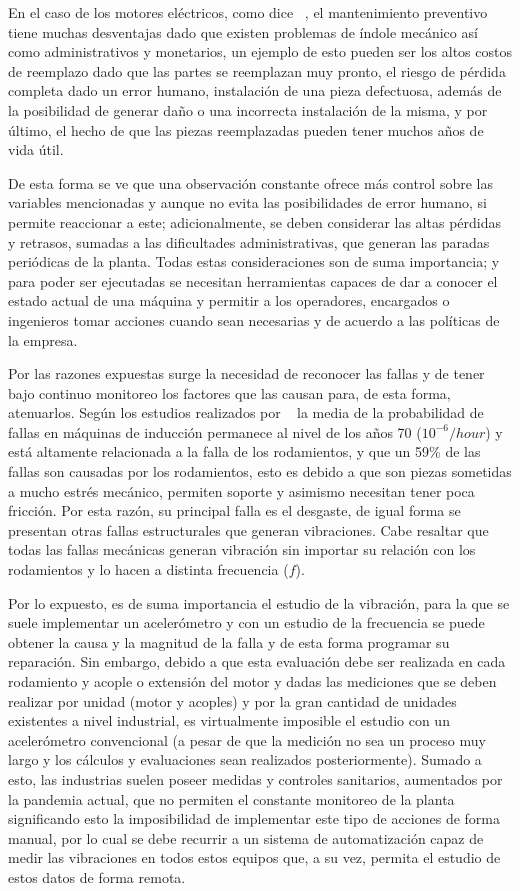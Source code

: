 En el caso de los motores eléctricos, como dice ~\textcite{Lacey}, el
mantenimiento preventivo tiene muchas desventajas dado que existen problemas de
índole mecánico así como administrativos y monetarios, un ejemplo de esto
pueden ser los altos costos de reemplazo dado que las partes se reemplazan muy
pronto, el riesgo de pérdida completa dado un error humano, instalación de una
pieza defectuosa, además de la posibilidad de generar daño o una incorrecta
instalación de la misma, y por último, el hecho de que las piezas reemplazadas
pueden tener muchos años de vida útil.

De esta forma se ve que una observación constante ofrece más control sobre las
variables mencionadas y aunque no evita las posibilidades de error humano, si
permite reaccionar a este; adicionalmente, se deben considerar las altas
pérdidas y retrasos, sumadas a las dificultades administrativas, que generan
las paradas periódicas de la planta. Todas estas consideraciones son de suma
importancia; y para poder ser ejecutadas se necesitan herramientas capaces de
dar a conocer el estado actual de una máquina y permitir a los operadores,
encargados o ingenieros tomar acciones cuando sean necesarias y de acuerdo a
las políticas de la empresa.

Por las razones expuestas surge la necesidad de reconocer las fallas y de tener
bajo continuo monitoreo los factores que las causan para, de esta forma,
atenuarlos. Según los estudios realizados por ~\textcite{Kammermann} la media
de la probabilidad de fallas en máquinas de inducción permanece al nivel de los
años 70 ($10^{-6}/hour$) y está altamente relacionada a la falla de los
rodamientos, y que un 59\% de las fallas son causadas por los rodamientos, esto
es debido a que son piezas sometidas a mucho estrés mecánico, permiten soporte
y asimismo necesitan tener poca fricción. Por esta razón, su principal falla es
el desgaste, de igual forma se presentan otras fallas estructurales que generan
vibraciones. Cabe resaltar que todas las fallas mecánicas generan vibración sin
importar su relación con los rodamientos y lo hacen a distinta frecuencia
($f$).

Por lo expuesto, es de suma importancia el estudio de la vibración, para la que
se suele implementar un acelerómetro y con un estudio de la frecuencia se puede
obtener la causa y la magnitud de la falla y de esta forma programar su
reparación. Sin embargo, debido a que esta evaluación debe ser realizada en
cada rodamiento y acople o extensión del motor  y dadas las mediciones que se
deben realizar por unidad (motor y acoples) y por la gran cantidad de unidades
existentes a nivel industrial, es virtualmente imposible el estudio con un
acelerómetro convencional (a pesar de que la medición no sea un proceso muy
largo y los cálculos y evaluaciones sean realizados posteriormente). Sumado a
esto, las industrias suelen poseer medidas y controles sanitarios, aumentados
por la pandemia actual, que no permiten el constante monitoreo de la planta
significando esto la imposibilidad de implementar este tipo de acciones de
forma manual, por lo cual se debe recurrir a un sistema de automatización capaz
de medir las vibraciones en todos estos equipos que, a su vez, permita el
estudio de estos datos de forma remota.
